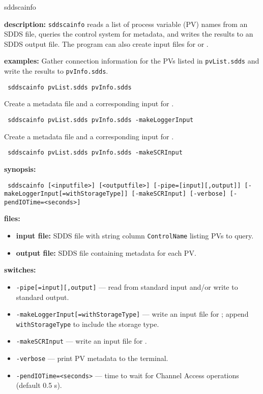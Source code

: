 %
%
\begin{sddsprog}{sddscainfo}
\item \textbf{description:}
  \verb+sddscainfo+ reads a list of process variable (PV) names from an SDDS file,
  queries the control system for metadata, and writes the results to an SDDS output file.
  The program can also create input files for  or .

\item \textbf{examples:}
  Gather connection information for the PVs listed in \verb+pvList.sdds+ and write the results to \verb+pvInfo.sdds+.
  \begin{flushleft}{\tt
sddscainfo pvList.sdds pvInfo.sdds
  }\end{flushleft}
  Create a metadata file and a corresponding input for .
  \begin{flushleft}{\tt
sddscainfo pvList.sdds pvInfo.sdds -makeLoggerInput
  }\end{flushleft}
  Create a metadata file and a corresponding input for .
  \begin{flushleft}{\tt
sddscainfo pvList.sdds pvInfo.sdds -makeSCRInput
  }\end{flushleft}

\item \textbf{synopsis:}
  \begin{flushleft}{\tt
sddscainfo [<inputfile>] [<outputfile>]\
[-pipe=[input][,output]]\
[-makeLoggerInput[=withStorageType]]\
[-makeSCRInput]\
[-verbose]\
[-pendIOTime=<seconds>]
  }\end{flushleft}

\item \textbf{files:}
\begin{itemize}
  \item \textbf{input file:} SDDS file with string column \verb|ControlName| listing PVs to query.
  \item \textbf{output file:} SDDS file containing metadata for each PV.
\end{itemize}

\item \textbf{switches:}
\begin{itemize}
  \item {\tt -pipe[=input][,output]} --- read from standard input and/or write to standard output.
  \item {\tt -makeLoggerInput[=withStorageType]} --- write an input file for ; append \verb|withStorageType| to include the storage type.
  \item {\tt -makeSCRInput} --- write an input file for .
  \item {\tt -verbose} --- print PV metadata to the terminal.
  \item {\tt -pendIOTime=<seconds>} --- time to wait for Channel Access operations (default 0.5 s).
\end{itemize}


\end{sddsprog}
